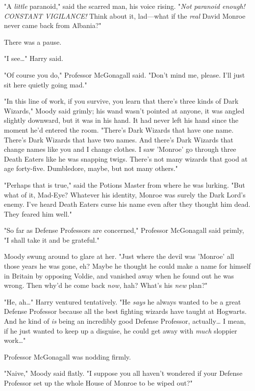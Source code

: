 "A \emph{little} paranoid," said the scarred man, his voice rising. "\emph{Not 
paranoid enough! CONSTANT VIGILANCE!} Think about it, lad---what if the 
\emph{real} David Monroe never came back from Albania?"

There was a pause.

"I see{\ldots}" Harry said.

"Of course you do," Professor McGonagall said. "Don't mind me, please. I'll 
just sit here quietly going mad."

"In this line of work, if you survive, you learn that there's three kinds of 
Dark Wizards," Moody said grimly; his wand wasn't pointed at anyone, it was 
angled slightly downward, but it was in his hand. It had never left his hand 
since the moment he'd entered the room. "There's Dark Wizards that have one 
name. There's Dark Wizards that have two names. And there's Dark Wizards that 
change names like you and I change clothes. I saw 'Monroe' go through three 
Death Eaters like he was snapping twigs. There's not many wizards that good at 
age forty-five. Dumbledore, maybe, but not many others."

"Perhaps that is true," said the Potions Master from where he was lurking. "But 
what of it, Mad-Eye? Whatever his identity, Monroe was surely the Dark Lord's 
enemy. I've heard Death Eaters curse his name even after they thought him dead. 
They feared him well."

"So far as Defense Professors are concerned," Professor McGonagall said primly, 
"I shall take it and be grateful."

Moody swung around to glare at her. "Just where the devil was 'Monroe' all 
those years he was gone, eh? Maybe he thought he could make a name for himself 
in Britain by opposing Voldie, and vanished away when he found out he was 
wrong. Then why'd he come back \emph{now,} hah? What's his \emph{new} plan?"

"He, ah{\ldots}" Harry ventured tentatively. "He \emph{says} he always wanted 
to be a great Defense Professor because all the best fighting wizards have 
taught at Hogwarts. And he kind of \emph{is} being an incredibly good Defense 
Professor, actually{\ldots} I mean, if he just wanted to keep up a disguise, he 
could get away with \emph{much} sloppier work{\ldots}"

Professor McGonagall was nodding firmly.

"Naive," Moody said flatly. "I suppose you all haven't wondered if your Defense 
Professor set up the whole House of Monroe to be wiped out?"

